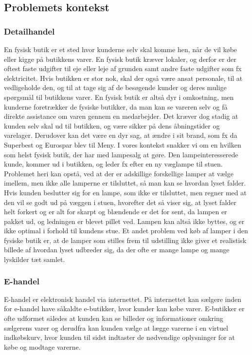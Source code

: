 \subsection{Problemets kontekst}
\lipsum[1-2]


\subsubsection{Detailhandel}
En fysisk butik er et sted hvor kunderne selv skal komme hen, når de vil købe eller kigge på butikkens varer. En fysisk butik kræver lokaler, og derfor er der oftest faste udgifter til eje eller leje af grunden samt andre faste udgifter som fx elektricitet. Hvis butikken er stor nok, skal der også være ansat personale, til at vedligeholde den, og til at tage sig af de besøgende kunder og deres mulige spørgsmål til butikkens varer. En fysisk butik er altså dyr i omkostning, men kunderne foretrækker de fysiske butikker, da man kan se vareren selv og få direkte assistance om varen gennem en medarbejder. Det kræver dog stadig at kunden selv skal ud til butikken, og være sikker på dens åbningstider og varelager. Derudover kan det være en dyr sag, at ændre i sit brand, som fx da Superbest og Eurospar blev til Meny.
I vores kontekst snakker vi om en hvilken som helst fysisk butik, der har med lampesalg at gøre. Den lampeinteresserede kunde, kommer ud i butikken, og leder fx efter en ny væglampe til stuen. Problemet heri kan opstå, ved at der er adskillige forskellige lamper at vælge imellem, men ikke alle lamperne er tilsluttet, så man kan se hvordan lyset falder. Hvis kunden beslutter sig for en lampe, som ikke er tilsluttet, men regner med at den vil se godt ud på væggen i stuen, hvorefter det så viser sig, at lyset falder helt forkert og er alt for skarpt og blændende er det for sent, da lampen er pakket ud, og ledningen er blevet pillet ved. Lampen kan altså ikke byttes, og er ikke optimal i forhold til kundens stue. Et andet problem ved køb af lamper i den fysiske butik er, at de lamper som stilles frem til udstilling ikke giver et realistisk billede af hvordan lyset udbreder sig, da der ofte er mange lampe og mange lyskilder tæt samlet. 

\subsubsection{E-handel}
E-handel er elektronisk handel via internettet\cite{ddo_ehandel}. På internettet kan sælgere inden for e-handel have såkaldte e-butikker, hvor kunder kan købe varer\cite{ddo_ebutik}. E-butikker er ofte udformet således at kunden kan se billeder og informationer omkring sælgerens varer og derudfra kan kunden vælge at lægge varerne i en virtuel indkøbskurv, hvor kunden til sidst indtaster de nødvendige oplysninger for at købe og modtage varerne.


